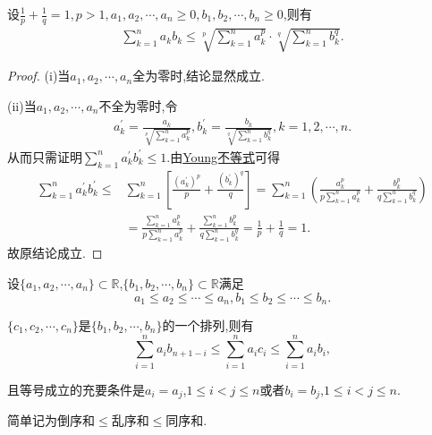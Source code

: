 \documentclass[../../main.tex]{subfiles}%
\begin{document}
\begin{theorem}[离散的Hölder不等式]\label{theorem:离散的Hölder不等式}
设$\frac{1}{p}+\frac{1}{q}=1,p>1,a_1,a_2,\cdots,a_n\geqslant 0,b_1,b_2,\cdots,b_n\geqslant 0$,则有
\begin{align*}
\sum\limits_{k=1}^n{a_kb_k}\leqslant \sqrt[p]{\sum\limits_{k=1}^n{a_{k}^{p}}}\cdot \sqrt[q]{\sum\limits_{k=1}^n{b_{k}^{q}}}.
\end{align*}
\end{theorem}
\begin{proof}

(i)当$a_1,a_2,\cdots,a_n$全为零时,结论显然成立.

(ii)当$a_1,a_2,\cdots,a_n$不全为零时,令
\begin{align*}
a_{k}^{\prime}=\frac{a_k}{\sqrt[p]{\sum\limits_{k=1}^n{a_{k}^{p}}}},b_{k}^{\prime}=\frac{b_k}{\sqrt[q]{\sum\limits_{k=1}^n{b_{k}^{q}}}},k=1,2,\cdots,n.
\end{align*}
从而只需证明$\sum\limits_{k=1}^n{a_{k}^{\prime}b_{k}^{\prime}}\leqslant 1$.由\hyperref[theorem:Young不等式]{Young不等式}可得
\begin{align*}
\sum\limits_{k=1}^n{a_{k}^{\prime}b_{k}^{\prime}}\leqslant &\sum\limits_{k=1}^n{\left[ \frac{\left( a_{k}^{\prime} \right) ^p}{p}+\frac{\left( b_{k}^{\prime} \right) ^q}{q} \right]}=\sum\limits_{k=1}^n{\left( \frac{a_{k}^{p}}{p\sum\limits_{k=1}^n{a_{k}^{p}}}+\frac{b_{k}^{p}}{q\sum\limits_{k=1}^n{b_{k}^{q}}} \right)}
\\
&=\frac{\sum\limits_{k=1}^n{a_{k}^{p}}}{p\sum\limits_{k=1}^n{a_{k}^{p}}}+\frac{\sum\limits_{k=1}^n{b_{k}^{p}}}{q\sum\limits_{k=1}^n{b_{k}^{q}}}=\frac{1}{p}+\frac{1}{q}=1.
\end{align*}
故原结论成立.

\end{proof}

\begin{theorem}[排序和不等式]\label{theorem:排序和不等式}
设\(\{a_1,a_2,\cdots,a_n\} \subset \mathbb{R}\),\(\{b_1,b_2,\cdots,b_n\} \subset \mathbb{R}\)满足
\[
a_1 \leqslant  a_2 \leqslant  \cdots \leqslant  a_n, b_1 \leqslant  b_2 \leqslant  \cdots \leqslant  b_n.
\]

\(\{c_1,c_2,\cdots,c_n\}\)是\(\{b_1,b_2,\cdots,b_n\}\)的一个排列,则有
\[
\sum\limits_{i = 1}^{n} a_i b_{n + 1 - i} \leqslant  \sum\limits_{i = 1}^{n} a_i c_i \leqslant  \sum\limits_{i = 1}^{n} a_i b_i,
\]

且等号成立的充要条件是\(a_i = a_j\),\(1 \leqslant  i < j \leqslant  n\)或者\(b_i = b_j\),\(1 \leqslant  i < j \leqslant  n\).
\end{theorem}
\begin{note}
简单记为倒序和\(\leqslant \)乱序和\(\leqslant \)同序和.
\end{note}
\end{document}
